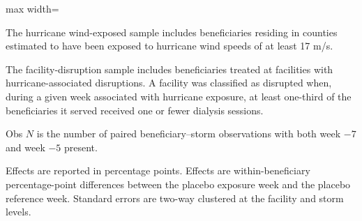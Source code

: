 \documentclass[11pt]{article}
\begin{document}
\begin{table}[!htbp]
\begin{adjustbox}{max width=\textwidth}
\begin{threeparttable}
\begin{tablenotes}[flushleft]
\addlinespace[0.8em]

\item[a] The hurricane wind-exposed sample includes beneficiaries residing in counties estimated to have been exposed to hurricane wind speeds of at least 17 m/s.

\item[b] The facility-disruption sample includes beneficiaries treated at facilities with hurricane-associated disruptions. A facility was classified as disrupted when, during a given week associated with hurricane exposure, at least one-third of the beneficiaries it served received one or fewer dialysis sessions.

\item[c] Obs $N$ is the number of paired beneficiary--storm observations with both week $-7$ and week $-5$ present.

\item[d] Effects are reported in percentage points. Effects are within-beneficiary percentage-point differences between the placebo exposure week and the placebo reference week. Standard errors are two-way clustered at the facility and storm levels.

\end{tablenotes}

\end{threeparttable}
\end{adjustbox}

\end{table}
\end{document}
